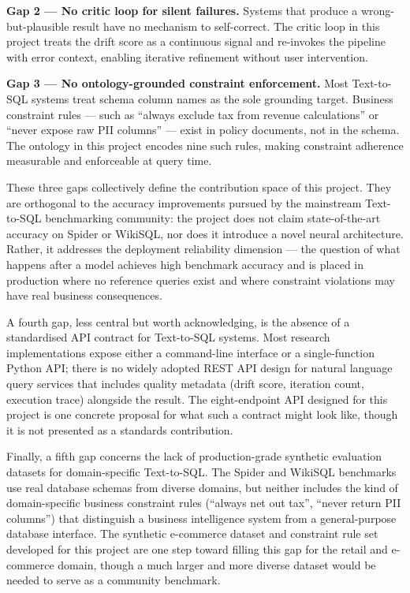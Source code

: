 \documentclass[12pt,a4paper]{report}
\begin{document}
\textbf{Gap 2 — No critic loop for silent failures.} Systems that produce a wrong-but-plausible result have no mechanism to self-correct. The critic loop in this project treats the drift score as a continuous signal and re-invokes the pipeline with error context, enabling iterative refinement without user intervention.

\textbf{Gap 3 — No ontology-grounded constraint enforcement.} Most Text-to-SQL systems treat schema column names as the sole grounding target. Business constraint rules --- such as ``always exclude tax from revenue calculations'' or ``never expose raw \ac{PII} columns'' --- exist in policy documents, not in the schema. The ontology in this project encodes nine such rules, making constraint adherence measurable and enforceable at query time.

These three gaps collectively define the contribution space of this project. They are orthogonal to the accuracy improvements pursued by the mainstream Text-to-SQL benchmarking community: the project does not claim state-of-the-art accuracy on Spider or WikiSQL, nor does it introduce a novel neural architecture. Rather, it addresses the deployment reliability dimension — the question of what happens after a model achieves high benchmark accuracy and is placed in production where no reference queries exist and where constraint violations may have real business consequences.

A fourth gap, less central but worth acknowledging, is the absence of a standardised API contract for Text-to-SQL systems. Most research implementations expose either a command-line interface or a single-function Python API; there is no widely adopted REST API design for natural language query services that includes quality metadata (drift score, iteration count, execution trace) alongside the result. The eight-endpoint API designed for this project is one concrete proposal for what such a contract might look like, though it is not presented as a standards contribution.

Finally, a fifth gap concerns the lack of production-grade synthetic evaluation datasets for domain-specific Text-to-SQL. The Spider and WikiSQL benchmarks use real database schemas from diverse domains, but neither includes the kind of domain-specific business constraint rules (``always net out tax'', ``never return PII columns'') that distinguish a business intelligence system from a general-purpose database interface. The synthetic e-commerce dataset and constraint rule set developed for this project are one step toward filling this gap for the retail and e-commerce domain, though a much larger and more diverse dataset would be needed to serve as a community benchmark.
\end{document}
